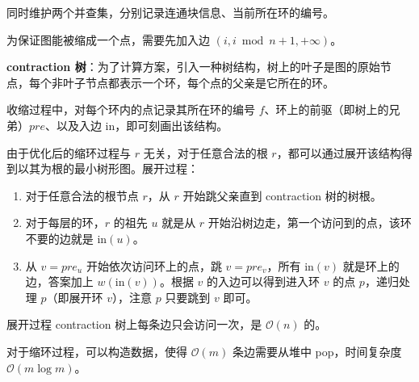 同时维护两个并查集，分别记录连通块信息、当前所在环的编号。

为保证图能被缩成一个点，需要先加入边 $(i,i \bmod n+1,+\infty)$。

\begin{tcolorbox}
\textbf{contraction 树}：为了计算方案，引入一种树结构，树上的叶子是图的原始节点，每个非叶子节点都表示一个环，每个点的父亲是它所在的环。
\end{tcolorbox}

收缩过程中，对每个环内的点记录其所在环的编号 $f$、环上的前驱（即树上的兄弟）$pre$、以及入边 $\text{in}$，即可刻画出该结构。

由于优化后的缩环过程与 $r$ 无关，对于任意合法的根 $r$，都可以通过展开该结构得到以其为根的最小树形图。展开过程：

\begin{enumerate}

    \item 对于任意合法的根节点 $r$，从 $r$ 开始跳父亲直到 contraction 树的树根。

    \item 对于每层的环，$r$ 的祖先 $u$ 就是从 $r$ 开始沿树边走，第一个访问到的点，该环不要的边就是 $\text{in}(u)$。

    \item 从 $v=pre_u$ 开始依次访问环上的点，跳 $v=pre_v$，所有 $\text{in}(v)$ 就是环上的边，答案加上 $w(\text{in}(v))$。根据 $v$ 的入边可以得到进入环 $v$ 的点 $p$，递归处理 $p$（即展开环 $v$），注意 $p$ 只要跳到 $v$ 即可。

\end{enumerate}

展开过程 contraction 树上每条边只会访问一次，是 $\mathcal{O}(n)$ 的。

对于缩环过程，可以构造数据，使得 $\mathcal{O}(m)$ 条边需要从堆中 pop，时间复杂度 $\mathcal{O}(m \log m)$。

